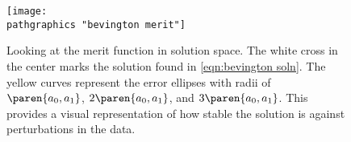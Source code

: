 \begin{figure}[t]
	\texttt{[image: \\pathgraphics "bevington merit"]}
	\caption{Looking at the merit function in solution space. The white cross in the center marks the solution found in \eqref{eqn:bevington soln}. The yellow curves represent the error ellipses with radii of $\paren{a_{0},a_{1}}$, $2\paren{a_{0},a_{1}}$, and $3\paren{a_{0},a_{1}}$. This provides a visual representation of how stable the solution is against perturbations in the data.}
	\label{fig:merit}
\end{figure}

\endinput  %